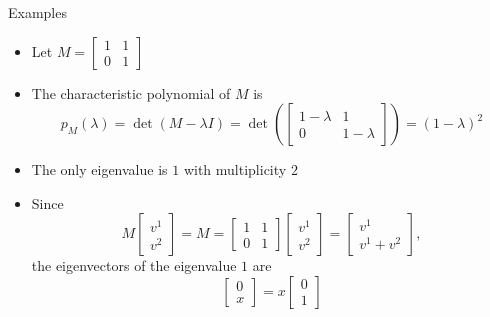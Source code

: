 \documentclass[usenames,dvipsnames,10pt]{beamer}
\begin{document}
\begin{frame}
  {Examples}

  \begin{itemize}
  \item Let $M = \begin{bmatrix} 1 & 1 \\ 0 & 1 \end{bmatrix}$
  \item The characteristic polynomial of $M$ is
    \[
      p_M(\lambda) = \det(M-\lambda I) = \det\left(\begin{bmatrix} 1-\lambda & 1 \\ 0 & 1-\lambda \end{bmatrix}\right)
      = (1-\lambda)^2
    \]
  \item The only eigenvalue is $1$ with multiplicity $2$
  \item Since
    \[ M\begin{bmatrix} v^1 \\ v^2 \end{bmatrix} = M = \begin{bmatrix} 1 & 1 \\ 0 & 1 \end{bmatrix}\begin{bmatrix} v^1 \\ v^2 \end{bmatrix}
      = \begin{bmatrix} v^1 \\ v^1 + v^2 \end{bmatrix},
    \]
    the eigenvectors of the eigenvalue $1$ are
    \[
      \begin{bmatrix} 0 \\ x \end{bmatrix} = x\begin{bmatrix} 0 \\ 1 \end{bmatrix}
    \]
  \end{itemize}
\end{frame}
\end{document}
